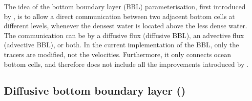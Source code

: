 \documentclass[../tex_main/NEMO_manual]{subfiles}
\begin{document}
The idea of the bottom boundary layer (BBL) parameterisation, first introduced by 
\citet{Beckmann_Doscher1997}, is to allow a direct communication between 
two adjacent bottom cells at different levels, whenever the densest water is 
located above the less dense water. The communication can be by a diffusive flux
(diffusive BBL), an advective flux (advective BBL), or both. In the current 
implementation of the BBL, only the tracers are modified, not the velocities. 
Furthermore, it only connects ocean bottom cells, and therefore does not include 
all the improvements introduced by \citet{Campin_Goosse_Tel99}.

\subsection{Diffusive bottom boundary layer (\protect{})}
\label{subsec:TRA_bbl_diff}
\end{document}
